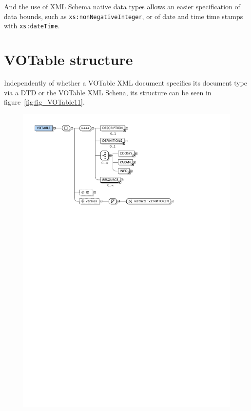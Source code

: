 And the use of XML Schema native data types allows an easier
specification of data bounds, such as \texttt{xs:nonNegativeInteger},
or of date and time time stamps with \texttt{xs:dateTime}.



\section{VOTable structure} %
\label{sec:votable_structure}

Independently of whether a VOTable XML document specifies its document
type via a DTD or the VOTable XML Schena, its structure can be seen in
figure~\ref{fig:fig_VOTable11}.

\begin{figure}[tbp]
	\centering
		\includegraphics[width=\columnwidth]{fig/VOTable11.pdf}

\end{figure}
